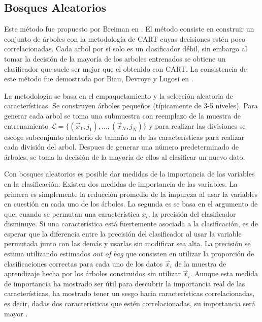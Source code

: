 \documentclass[letterpaper,12pt]{book}
\begin{document}
\subsection{Bosques Aleatorios}

Este método fue propuesto por Breiman en \cite{breiman_random_2001}. El método consiste en construir un conjunto de árboles con la metodología de CART cuyas decisiones estén poco correlacionadas. Cada arbol por sí solo es un clasificador débil, sin embargo al tomar la decisión de la mayoría de los arboles entrenados se obtiene un clasificador que suele ser mejor que el obtenido con CART. La consistencia de este método fue demostrada por Biau, Devroye y Lugosi en \cite{biau_consistency_2008}.

La metodología se basa en el empaquetamiento y la selección aleatoria de características. Se construyen árboles pequeños (típicamente de 3-5 niveles). Para generar cada arbol se toma una submuestra con reemplazo de la muestra de entrenamiento $\mathcal{L}=\{(\vec{x}_1,j_1),\dots,(\vec{x}_N,j_N)\}$ y para realizar las divisiones se escoge subconjunto aleatorio de tamaño m de las características  para realizar cada división del arbol. Despues de generar una número predeterminado de árboles, se toma la decisión de la mayoría de ellos al clasificar un nuevo dato.

Con bosques aleatorios es posible dar medidas de la importancia de las variables en la clasificación. Existen dos medidas de importancia de las variables. La primera es simplemente la reducción promedio de la impureza al usar la variables en cuestión en cada uno de los árboles. La segunda es se basa en el argumento de que, cuando se permutan una característica $x_i$, la precisión del clasificador disminuye. Si una característica está fuertemente asociada a la clasificación, es de esperar que la diferencia entre la precisión del clasificador al usar la variable permutada junto con las demás y usarlas sin modificar sea alta. La precisión se estima utilizando estimados \textit{out of bag} que consisten en utilizar la proporción de clasificaciones correctas para cada uno de los datos $\vec{x}_i$ de la muestra de aprendizaje hecha por los árboles construidos sin utilizar $\vec{x}_i$. Aunque esta medida de importancia ha mostrado ser útil para descubrir la importancia real de las características, ha mostrado tener un sesgo hacia características correlacionadas, es decir, dadas dos características que estén correlacionadas, su importancia será mayor \cite{strobl_conditional_2008}.
\end{document}
